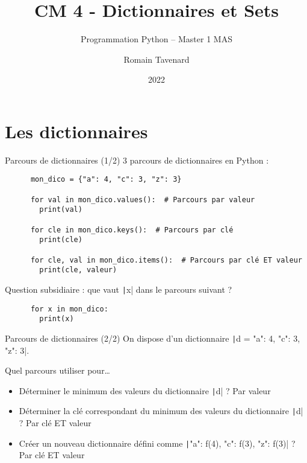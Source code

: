 \documentclass[10pt]{beamer}
\title[M1 MAS -- Python -- Dictionnaires]{CM 4 - Dictionnaires et Sets}
\subtitle{Programmation Python -- Master 1 MAS}
\author{Romain Tavenard}
\date{2022}
\institute{%
\hypersetup{urlcolor=.}
\makebox[2.2ex][c]{\faEnvelope}\enspace\href{mailto:romain.tavenard@univ-rennes2.fr}{\texttt{romain.tavenard@univ-rennes2.fr}}\\%
}
\begin{document}
\maketitle

\section{Les dictionnaires}

\begin{frame}[fragile]{Parcours de dictionnaires (1/2)}  
  3 parcours de dictionnaires en Python :

  \begin{beamercodeblock}
    \begin{verbatim}
      mon_dico = {"a": 4, "c": 3, "z": 3}

      for val in mon_dico.values():  # Parcours par valeur
        print(val)

      for cle in mon_dico.keys():  # Parcours par clé
        print(cle)
      
      for cle, val in mon_dico.items():  # Parcours par clé ET valeur
        print(cle, valeur)
    \end{verbatim}
  \end{beamercodeblock}

  \pause

  Question subsidiaire : que vaut \texttt|x| dans le parcours suivant ?

  \begin{beamercodeblock}
    \begin{verbatim}
      for x in mon_dico:
        print(x)
    \end{verbatim}
  \end{beamercodeblock}
\end{frame}

\begin{frame}[fragile]{Parcours de dictionnaires (2/2)}  
  On dispose d'un dictionnaire \texttt|d = {"a": 4, "c": 3, "z": 3}|.

  Quel parcours utiliser pour\dots

  \begin{itemize}
    \item Déterminer le minimum des valeurs du dictionnaire \texttt|d| ? \pause \alert{Par valeur}
    \item Déterminer la clé correspondant du minimum des valeurs du dictionnaire \texttt|d| ? \pause \alert{Par clé ET valeur}
    \item Créer un nouveau dictionnaire défini comme \texttt|{"a": f(4), "c": f(3), "z": f(3)}| ? \pause \alert{Par clé ET valeur}
  \end{itemize}
\end{frame}
\end{document}
